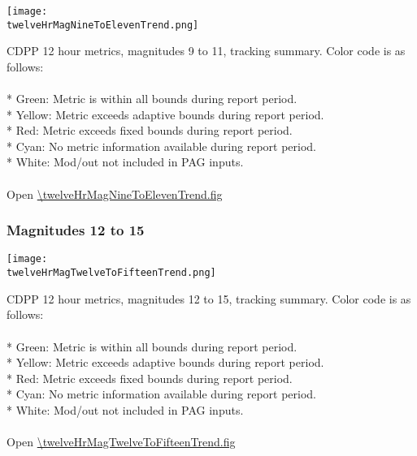 \begin{center}
\texttt{[image: \\twelveHrMagNineToElevenTrend.png]}
\end{center}
CDPP 12 hour metrics, magnitudes 9 to 11, tracking summary. Color code is as follows:\\
\\
* Green: Metric is within all bounds during report period.\\
* Yellow: Metric exceeds adaptive bounds during report period.\\
* Red: Metric exceeds fixed bounds during report period.\\
* Cyan: No metric information available during report period.\\
* White: Mod/out not included in PAG inputs.\\
\\
Open \url{\twelveHrMagNineToElevenTrend.fig}

\newpage

\subsubsection{Magnitudes 12 to 15}

\begin{center}
\texttt{[image: \\twelveHrMagTwelveToFifteenTrend.png]}
\end{center}
CDPP 12 hour metrics, magnitudes 12 to 15, tracking summary. Color code is as follows:\\
\\
* Green: Metric is within all bounds during report period.\\
* Yellow: Metric exceeds adaptive bounds during report period.\\
* Red: Metric exceeds fixed bounds during report period.\\
* Cyan: No metric information available during report period.\\
* White: Mod/out not included in PAG inputs.\\
\\
Open \url{\twelveHrMagTwelveToFifteenTrend.fig}

